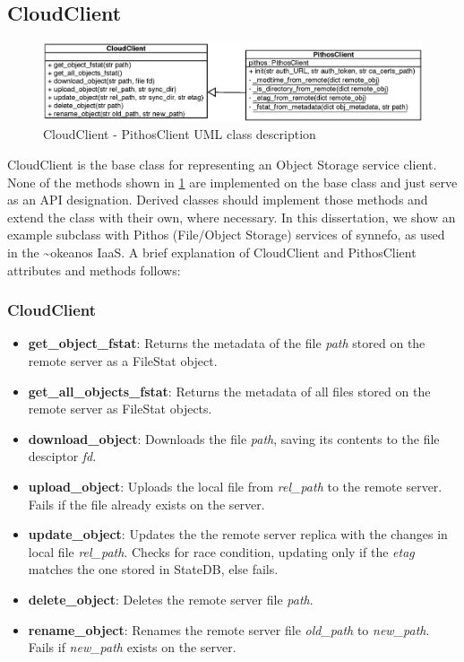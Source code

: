   \subsection{CloudClient}
    \begin{figure}[!htpb]
      \centering
      \includegraphics[width=1.1\textwidth]{Images/CloudClient.eps}
      \caption{CloudClient - PithosClient UML class description}
      \label{fig:cloud_uml}
    \end{figure}
    CloudClient is the base class for representing an Object Storage service client. None of the methods shown in \ref{fig:cloud_uml} are implemented on the base class and just serve as an API designation. Derived classes should implement those methods and extend the class with their own, where necessary. In this dissertation, we show an example subclass with Pithos (File/Object Storage) services of synnefo, as used in the \textasciitilde okeanos IaaS. A brief explanation of CloudClient and PithosClient attributes and methods follows:
    \subsubsection{CloudClient}
      \begin{itemize}
        \item \textbf{get\_object\_fstat}: Returns the metadata of the file \emph{path} stored on the remote server as a FileStat object.
        \item \textbf{get\_all\_objects\_fstat}: Returns the metadata of all files stored on the remote server as FileStat objects.
        \item \textbf{download\_object}: Downloads the file \emph{path}, saving its contents to the file desciptor \emph{fd}.
        \item \textbf{upload\_object}: Uploads the local file from \emph{rel\_path} to the remote server. Fails if the file already exists on the server.
        \item \textbf{update\_object}: Updates the the remote server replica with the changes in local file \emph{rel\_path}. Checks for race condition, updating only if the \emph{etag} matches the one stored in StateDB, else fails.
        \item \textbf{delete\_object}: Deletes the remote server file \emph{path}.
        \item \textbf{rename\_object}: Renames the remote server file \emph{old\_path} to \emph{new\_path}. Fails if \emph{new\_path} exists on the server.
      \end{itemize}
